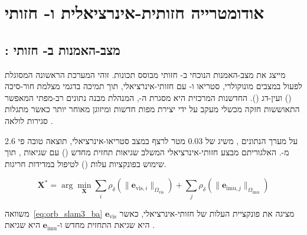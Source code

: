 

\section{אודומטרייה חזותית-אינרציאלית ו- חזותי}
\label{sec:oursystem}

\subsection{: מצב-האמנות ב- חזותי}
\label{subsec:orb_slam3}

 מייצג את מצב-האמנות הנוכחי ב- חזותי
מבוסס תכונות. זוהי המערכת הראשונה המסוגלת לפעול במצבים מונוקולרי,
סטריאו ו- עם  חזותי-אינרציאלי, תוך תמיכה
בדגמי מצלמת חור-סיכה () ועין-דג ().
החדשנות המרכזית היא מסגרת ה-, המנהלת מבנה נתונים
רב-מפתי המאפשר התאוששות חזקה מכשלי מעקב על ידי יצירת מפות
חדשות ומיזוגן מאוחר יותר כאשר מתגלות סגירות לולאה
\cite{MurArtal2015ORB}.

על מערך הנתונים ,  משיג 
של 0.03 מטר לרצף  במצב סטריאו-אינרציאלי, תוצאה טובה
פי 2.6 מ-. האלגוריתם מבצע 
חזותי-אינרציאלי המשלב שגיאות תחזית מחדש ()
עם שגיאות , תוך שימוש בפונקציות עלות
 () לטיפול במדידות חריגות.

\begin{equation}
    \mathbf{X}^* = \arg\min_{\mathbf{X}} \sum_{i} \rho_{\delta}\left( \| \mathbf{e}_{\text{vis},i} \|_{\Omega_{\text{vis}}} \right)
    + \sum_{j} \rho_{\delta}\left( \| \mathbf{e}_{\text{imu},j} \|_{\Omega_{\text{imu}}} \right)
    \label{eq:orb_slam3_ba}
\end{equation}

משוואה~\ref{eq:orb_slam3_ba} מציגה את פונקציית העלות של
 חזותי-אינרציאלי, כאשר $\mathbf{e}_{\text{vis}}$
היא שגיאת התחזית מחדש ו-$\mathbf{e}_{\text{imu}}$ היא שגיאת
.

